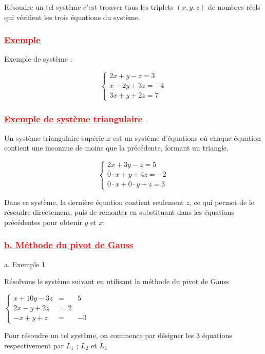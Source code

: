\documentclass[12pt]{article}
\begin{document}
Résoudre un tel système c’est trouver tous les triplets \((x, y, z)\) de nombres réels qui vérifient les trois équations du système.

\subsubsection*{\underline{\textbf{\textcolor{red}{ Exemple }}}}

Exemple de système :

\[
\begin{cases}
2x + y - z = 3 \\
x - 2y + 3z = -4 \\
3x + y + 2z = 7
\end{cases}
\]

\subsubsection*{\underline{\textbf{\textcolor{red}{Exemple de système triangulaire}}}}

Un système triangulaire supérieur est un système d'équations où chaque équation contient une inconnue de moins que la précédente, formant un triangle.

\[
\begin{cases}
2x + 3y - z = 5 \\
0 \cdot x + y + 4z = -2 \\
0 \cdot x + 0 \cdot y + z = 3
\end{cases}
\]

Dans ce système, la dernière équation contient seulement \( z \), ce qui permet de le résoudre directement, puis de remonter en substituant dans les équations précédentes pour obtenir \( y \) et \( x \).

\subsubsection*{\underline{\textbf{\textcolor{red}{b. Méthode du pivot de Gauss }}}}

a. Exemple 1

	Résolvons le système suivant en utilisant la méthode du pivot de Gauss

	$\left\lbrace\begin{array}{lcl}x+10y-3z& =&5\\2x-y+2z& = 2\\-x+y+z& =& -3\end{array}\right.$

	Pour résoudre un tel système, on commence par désigner les $3$ équations respectivement par $L_{1}$ ; $L_{2}$ et $L_{3}$
\end{document}
